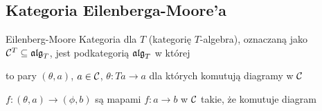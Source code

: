 \subsection{Kategoria Eilenberga-Moore'a}

\begin{definition}{Eilenberg-Moore}{}
  Kategoria  dla $T$ (kategorię $T$-algebra), oznaczaną jako $\mathcal{C}^T\subseteq\operatorname{\mathfrak{alg}}_T$, jest podkategorią $\operatorname{\mathfrak{alg}}_T$ w której
  \begin{description}[labelindent=5mm]
    \item[obiekty] to pary $(\theta, a)$, $a\in\mathcal{C}$, $\theta:Ta\to a$ dla których komutują diagramy w $\mathcal{C}$
      \begin{center}
      \end{center}
    \item[morfizmy] $f:(\theta, a)\to (\phi, b)$ są mapami $f:a\to b$ w $\mathcal{C}$ takie, że komutuje diagram
      \begin{center}
      \end{center}
  \end{description}
\end{definition}





%
%
